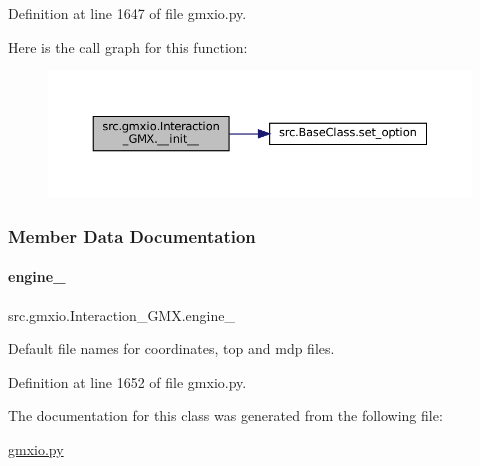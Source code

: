 Definition at line 1647 of file gmxio.\+py.

Here is the call graph for this function\+:
\nopagebreak
\begin{figure}[H]
\begin{center}
\leavevmode
\includegraphics[width=350pt]{classsrc_1_1gmxio_1_1Interaction__GMX_abf26d1083a7a68b119f684abf87e9d2b_cgraph}
\end{center}
\end{figure}


\subsubsection{Member Data Documentation}
\mbox{\label{classsrc_1_1gmxio_1_1Interaction__GMX_a98751cdf3eb6c64c424e9bb78c619e2d}} 
\paragraph{\texorpdfstring{engine\+\_\+}{engine\_}}
{\footnotesize\ttfamily src.\+gmxio.\+Interaction\+\_\+\+G\+M\+X.\+engine\+\_\+}



Default file names for coordinates, top and mdp files. 



Definition at line 1652 of file gmxio.\+py.



The documentation for this class was generated from the following file\+:\begin{DoxyCompactItemize}
\item 
\hyperlink{gmxio_8py}{gmxio.\+py}\end{DoxyCompactItemize}
